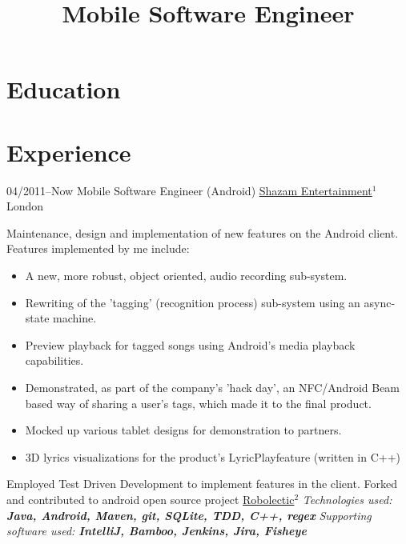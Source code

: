 \documentclass[11pt,a4paper,sans]{moderncv}   %
\title{Mobile Software Engineer}               %
\newcommand{\superscript}[1]{$^{#1}$}
\begin{document}
\makecvtitle

\section{Education}

\section{Experience}
\cventry
  {04/2011--Now}
  {Mobile Software Engineer (Android)}
  {\href{www.shazam.com}{Shazam Entertainment}\superscript{1}}
  {London}
  {}
  { 
    Maintenance, design and implementation of new features on the Android client.\newline{}%
    Features implemented by me include:
    \begin{itemize}%
    \item A new, more robust, object oriented, audio recording sub-system.
    \item Rewriting of the 'tagging' (recognition process) sub-system using an async-state machine. 
    \item Preview playback for tagged songs using Android's media playback capabilities.
    \item Demonstrated, as part of the company's 'hack day', an NFC/Android Beam based way of sharing a user's tags, which made it to the final product.
    \item Mocked up various tablet designs for demonstration to partners.
    \item 3D lyrics visualizations for the product's LyricPlay\texttrademark  feature (written in C++)
    \end{itemize}
    Employed Test Driven Development to implement features in the client.\newline{}%
    Forked and contributed to android open source project \href{https://github.com/shazam/robolectric}{Robolectic}\superscript{2}\newline{}%
    \emph{Technologies used: \textbf{Java, Android, Maven, git, SQLite, TDD, C++, regex}}\newline{}%
    \emph{Supporting software used: \textbf{IntelliJ, Bamboo, Jenkins, Jira, Fisheye}}
  }
  
\end{document}

